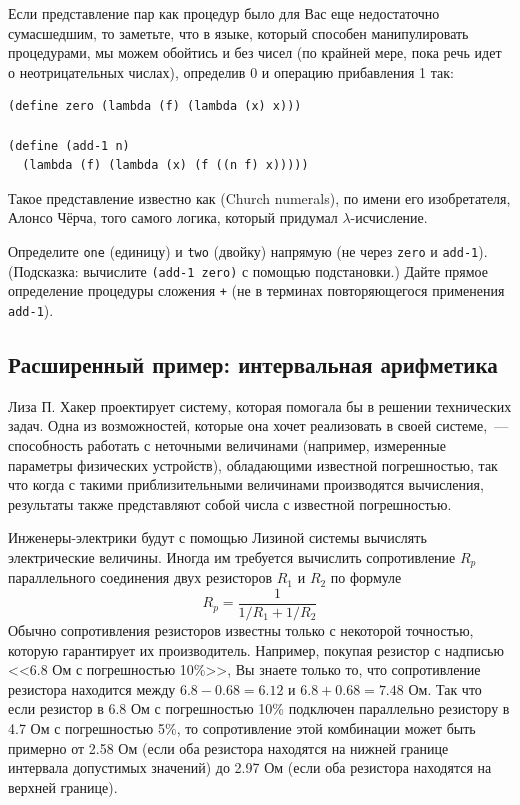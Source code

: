 \begin{exercise}{2.6}\label{EX2.6}%
Если представление пар как процедур было для Вас
еще недостаточно сумасшедшим, то заметьте, что в языке, который
способен манипулировать 
процедурами, мы можем обойтись и без чисел (по крайней мере, пока речь 
идет о неотрицательных числах), определив 0 и операцию прибавления 1
так:

\begin{Verbatim}[fontsize=\small]
(define zero (lambda (f) (lambda (x) x)))

(define (add-1 n)
  (lambda (f) (lambda (x) (f ((n f) x)))))
\end{Verbatim}
Такое представление известно как  (Church numerals), по имени его изобретателя,  Алонсо
Чёрча,
того самого логика, который придумал
$\lambda$-исчисление.

Определите {\tt one} (единицу) и {\tt two}
(двойку) напрямую (не через {\tt zero} и
{\tt add-1}). (Подсказка: вычислите {\tt (add-1 zero)} с 
помощью подстановки.)  Дайте прямое определение процедуры сложения
{\tt +} (не в терминах повторяющегося применения {\tt add-1}).
\end{exercise}

\subsection{Расширенный пример: интервальная арифметика}
\label{EXTENDED-EXERCISE-INTERVAL-ARITHMETIC}

% 
Лиза П. Хакер проектирует систему, которая помогала бы в
решении технических задач.  Одна из возможностей, которые она хочет
реализовать в своей системе,~--- способность работать с неточными
величинами (например, измеренные параметры физических устройств),
обладающими известной погрешностью, так что когда с такими
приблизительными величинами производятся вычисления, результаты также
представляют собой числа с известной погрешностью.

Инженеры-электрики будут с помощью Лизиной системы
вычислять электрические величины.  Иногда им требуется вычислить
сопротивление $R_p$ параллельного соединения двух
резисторов $R_1$ и $R_2$ по формуле
$$
R_p = \frac{1}{1 / R_1 + 1 / R_2}
$$
Обычно сопротивления резисторов известны только с некоторой точностью, 
которую гарантирует их производитель. 
Например,
покупая резистор с надписью <<6.8 Ом с погрешностью 10\%>>, Вы знаете только
то, что сопротивление резистора находится между $6.8 - 0.68 =
6.12$ и $6.8 + 0.68 = 7.48$ Ом.  Так что если
резистор в 6.8 Ом с погрешностью 10\%  подключен параллельно
резистору в 4.7 Ом с погрешностью 5\%, то сопротивление этой
комбинации может быть примерно от 2.58 Ом (если оба резистора
находятся на нижней границе  интервала допустимых значений) до 2.97 Ом
(если оба резистора находятся на верхней границе).

